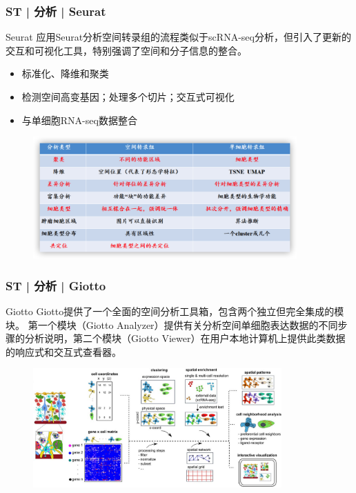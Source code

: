 \documentclass[11pt]{ctexbeamer}
\begin{document}
\begin{frame}
	\frametitle{ST | 分析 | Seurat}
		\begin{block}{Seurat}
			应用Seurat分析空间转录组的流程类似于scRNA-seq分析，但引入了更新的交互和可视化工具，特别强调了空间和分子信息的整合。
			\begin{itemize}
				\item 标准化、降维和聚类
				\item 检测空间高变基因；处理多个切片；交互式可视化
				\item 与单细胞RNA-seq数据整合
			\end{itemize}
	\end{block}
\vspace{-1em}
	\begin{figure}
		\includegraphics[width=0.9\textwidth]{ST_seurat_01.png}
	\end{figure}
\end{frame}

\begin{frame}
	\frametitle{ST | 分析 | Giotto}
		\begin{block}{Giotto}
	Giotto提供了一个全面的空间分析工具箱，包含两个独立但完全集成的模块。 第一个模块（Giotto Analyzer）提供有关分析空间单细胞表达数据的不同步骤的分析说明，第二个模块（Giotto Viewer）在用户本地计算机上提供此类数据的响应式和交互式查看器。
	\end{block}
\vspace{-0.5em}
		\begin{figure}
		\includegraphics[width=0.85\textwidth]{ST_gitto_01.png}
	\end{figure}
\end{frame}
\end{document}
